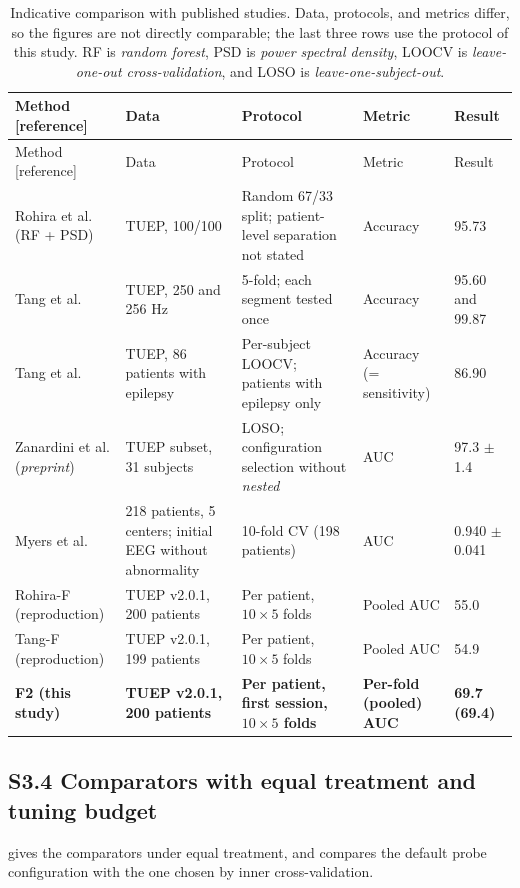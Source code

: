 {\scriptsize
\setlength{\tabcolsep}{3pt}
\begin{longtable}{p{}p{}p{}p{}p{}}
\caption{Indicative comparison with published studies. Data, protocols, and metrics differ, so the figures are not directly comparable; the last three rows use the protocol of this study. RF is \textit{random forest}, PSD is \textit{power spectral density}, LOOCV is \textit{leave-one-out cross-validation}, and LOSO is \textit{leave-one-subject-out}.}\label{tab:literatur}\\
\toprule
Method [reference] & Data & Protocol & Metric & Result \\
\midrule
\endfirsthead
\toprule
Method [reference] & Data & Protocol & Metric & Result \\
\midrule
\endhead
\bottomrule
\endfoot
Rohira et al. \cite{rohira2023} (RF + PSD) & TUEP, 100/100 & Random 67/33 split; patient-level separation not stated & Accuracy & 95.73 \\
Tang et al. \cite{tang2024} & TUEP, 250 and 256 Hz & 5-fold; each segment tested once & Accuracy & 95.60 and 99.87 \\
Tang et al. \cite{tang2024} & TUEP, 86 patients with epilepsy & Per-subject LOOCV; patients with epilepsy only & Accuracy (= sensitivity) & 86.90 \\
Zanardini et al. \cite{zanardini2026} (\textit{preprint}) & TUEP subset, 31 subjects & LOSO; configuration selection without \textit{nested} & AUC & 97.3 $\pm$ 1.4 \\
Myers et al. \cite{myers2025} & 218 patients, 5 centers; initial EEG without abnormality & 10-fold CV (198 patients) & AUC & 0.940 $\pm$ 0.041 \\
Rohira-F (reproduction) & TUEP v2.0.1, 200 patients & Per patient, $10\times5$ folds & Pooled AUC & 55.0 \\
Tang-F (reproduction) & TUEP v2.0.1, 199 patients & Per patient, $10\times5$ folds & Pooled AUC & 54.9 \\
\textbf{F2 (this study)} & \textbf{TUEP v2.0.1, 200 patients} & \textbf{Per patient, first session, $10\times5$ folds} & \textbf{Per-fold (pooled) AUC} & \textbf{69.7 (69.4)} \\
\end{longtable}
}

\subsection*{S3.4 Comparators with equal treatment and tuning budget}
 gives the comparators under equal treatment, and  compares the default probe configuration with the one chosen by inner cross-validation.

